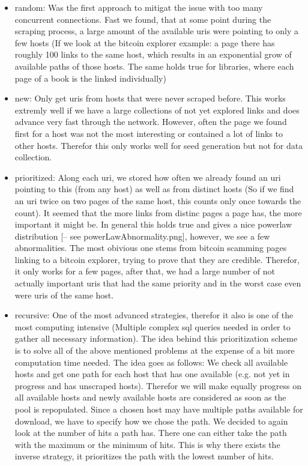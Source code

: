 \begin{itemize}
\begin{itemize}
      \begin{itemize}
        \item random: Was the first approach to mitigat the issue with too many concurrent connections. Fast we found, that at some point during the scraping process, a large amount of the available uris were pointing to only a few hosts (If we look at the bitcoin explorer example: a page there has roughly 100 links to the same host, which results in an exponential grow of available paths of those hosts. The same holds true for libraries, where each page of a book is the linked individually)
        \item new: Only get uris from hosts that were never scraped before. This works extremly well if we have a large collections of not yet explored links and does advance very fast through the network. However, often the page we found first for a host was not the most interesting or contained a lot of links to other hosts. Therefor this only works well for seed generation but not for data collection.
        \item prioritized: Along each uri, we stored how often we already found an uri pointing to this (from any host) as well as from distinct hosts (So if we find an uri twice on two pages of the same host, this counts only once towards the count). It seemed that the more links from distinc pages a page has, the more important it might be. In general this holds true and gives a nice powerlaw distribution [-- see powerLawAbnormality.png], however, we see a few abnormalities. The most obivious one stems from bitcoin scamming pages linking to a bitcoin explorer, trying to prove that they are credible. Therefor, it only works for a few pages, after that, we had a large number of not actually important uris that had the same priority and in the worst case even were uris of the same host.
        \item recursive: One of the most advanced strategies, therefor it also is one of the most computing intensive (Multiple complex sql queries needed in order to gather all necessary information). The idea behind this prioritization scheme is to solve all of the above mentioned problems at the expense of a bit more computation time needed. The idea goes as follows: We check all available hosts and get one path for each host that has one available (e.g. not yet in progress and has unscraped hosts). Therefor we will make equally progress on all available hosts and newly available hosts are considered as soon as the pool is repopulated. Since a chosen host may have multiple paths available for download, we have to specify how we chose the path. We decided to again look at the number of hits a path has. There one can either take the path with the maximum or the minimum of hits. This is why there exists the inverse strategy, it prioritizes the path with the lowest number of hits.

\end{itemize}
\end{itemize}
\end{itemize}
